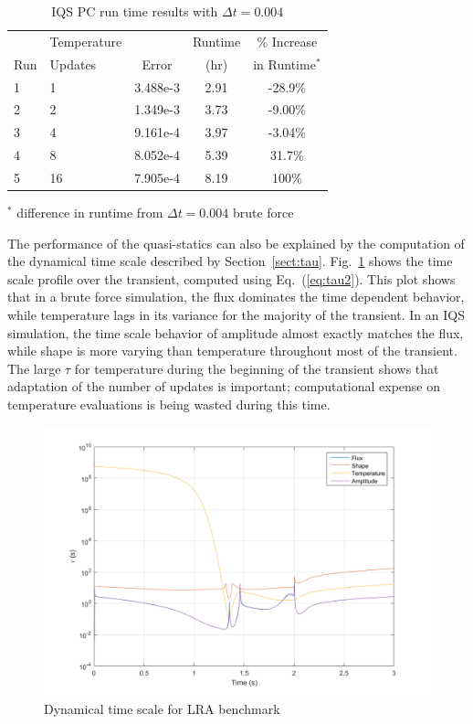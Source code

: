 \documentclass{anstrans}
\newcommand{\eqt}[1]{Eq.~(\ref{#1})}                     %
\newcommand{\fig}[1]{Fig.~\ref{#1}}                      %
\newcommand{\sct}[1]{Section~\ref{#1}}                   %
\begin{document}
\begin{table}[!htbp]
\begin{center}
\begin{tabular}{|l|l|ccc|}
\hline
	&  Temperature 	&  		& Runtime 	& \% Increase	\\
Run	&  Updates 	& Error & (hr)		& in Runtime$^*$\\
\hline
1	& 1		& 3.488e-3 	& 2.91 	& -28.9\%	\\
2	& 2		& 1.349e-3 	& 3.73	& -9.00\%	\\
3 	& 4 	& 9.161e-4 	& 3.97	& -3.04\%	\\
4 	& 8 	& 8.052e-4 	& 5.39	&  31.7\%	\\
5 	& 16	& 7.905e-4 	& 8.19	&  100\%	\\
\hline
\end{tabular}
\end{center}
\vspace{-3mm}
$^*$ difference in runtime from $\Delta t = 0.004$ brute force 
\caption{IQS PC run time results with $\Delta t = 0.004$}
\label{tab:iqspc_lra}
\end{table}

The performance of the quasi-statics can also be explained by the computation of the dynamical time scale described by \sct{sect:tau}.  \fig{fig:LRAtc} shows the time scale profile over the transient, computed using \eqt{eq:tau2}.  This plot shows that in a brute force simulation, the flux dominates the time dependent behavior, while temperature lags in its variance for the majority of the transient.  In an IQS simulation, the time scale behavior of amplitude almost exactly matches the flux, while shape is more varying than temperature throughout most of the transient.  The large $\tau$ for temperature during the beginning of the transient shows that adaptation of the number of updates is important; computational expense on temperature evaluations is being wasted during this time.

\begin{figure}[htbp!]
\centering
\includegraphics[width=\linewidth]{time_constant_lra.png}
\caption{Dynamical time scale for LRA benchmark}
\label{fig:LRAtc}
\end{figure}
\end{document}
